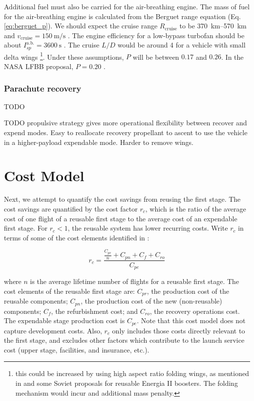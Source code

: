 \documentclass[conf]{new-aiaa}
\begin{document}
Additional fuel must also be carried for the air-breathing engine. The mass of fuel for the air-breathing engine is calculated from the Berguet range equation (Eq. \ref{eq:berguet_p}). We should expect the cruise range $R_{\mathrm{cruise}}$ to be \SIrange{370}{570}{\kilo\meter} \cite{Healy1998, Hellman2005} and $v_{\mathrm{cruise}} = \SI{150}{\meter\per\second}$ \cite{Healy1998}. The engine efficiency for a low-bypass turbofan should be about $I_{sp}^{\mathrm{a.b.}} = \SI{3600}{\second}$ \cite{Hellman2005}. The cruise $L/D$ would be around 4 for a vehicle with small delta wings \footnote{this could be increased by using high aspect ratio folding wings, as mentioned in \cite{Healy1998} and some Soviet proposals for reusable Energia II boosters. The folding mechanism would incur and additional mass penalty.}. Under these assumptions, $P$ will be between $0.17$ and $0.26$. In the NASA LFBB proposal, $P=0.20$ \cite{Healy1998}.


\subsubsection{Parachute recovery}
TODO



TODO propulsive strategy gives more operational flexibility between recover and expend modes. Easy to reallocate recovery propellant to ascent to use the vehicle in a higher-payload expendable mode.  Harder to remove wings.



\section{Cost Model}
Next, we attempt to quantify the cost savings from reusing the first stage. The cost savings are quantified by the cost factor $r_c$, which is the ratio of the average cost of one flight of a reusable first stage to the average cost of an expendable first stage. For $r_c < 1$, the reusable system has lower recurring costs. Write $r_c$ in terms of some of the cost elements identified in \cite{Sforza2015}:

\begin{equation}
\label{eq:cost_elements}
r_c = \frac{\frac{C_{pr}}{n} + C_{pn} + C_f + C_{ro}}{C_{pe}}
\end{equation}

where $n$ is the average lifetime number of flights for a reusable first stage. The cost elements of the reusable first stage are: $C_{pr}$, the production cost of the reusable components; $C_{pn}$, the production cost of the new (non-reusable) components; $C_f$, the refurbishment cost; and $C_{ro}$, the recovery operations cost. The expendable stage production cost is $C_{pe}$. Note that this cost model does not capture development costs. Also, $r_c$ only includes those costs directly relevant to the first stage, and excludes other factors which contribute to the launch service cost (upper stage, facilities, and insurance, etc.).
\end{document}
